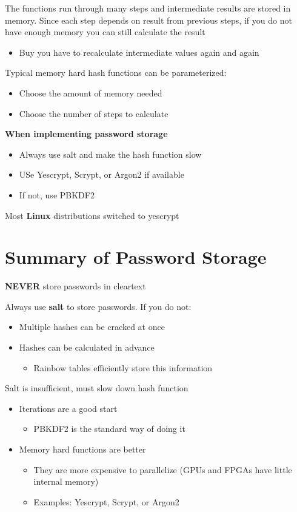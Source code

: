 \documentclass[11pt]{article}
\begin{document}
The functions run through many steps and intermediate results are stored in memory. Since each step depends on result from previous steps, if you do not have enough memory you can still calculate the result
\begin{itemize}
	\item Buy you have to recalculate intermediate values again and again
\end{itemize}

Typical memory hard hash functions can be parameterized:
\begin{itemize}
	\item Choose the amount of memory needed
	\item Choose the number of steps to calculate
\end{itemize}
\textbf{When implementing password storage}

\begin{itemize}
	\item Always use salt and make the hash function slow
	\item USe Yescrypt, Scrypt, or Argon2 if available
	\item If not, use PBKDF2
\end{itemize}

Most \textbf{Linux} distributions switched to yescrypt 

\section*{Summary of Password Storage}
\textbf{NEVER} store passwords in cleartext

Always use \textbf{salt} to store passwords. If you do not:
\begin{itemize}
	\item Multiple hashes can be cracked at once
	\item Hashes can be calculated in advance
		\begin{itemize}
			\item Rainbow tables efficiently store this information
		\end{itemize}
\end{itemize}

Salt is insufficient, must slow down hash function
\begin{itemize}
	\item Iterations are a good start
		\begin{itemize}
			\item PBKDF2 is the standard way of doing it
		\end{itemize}
	\item Memory hard functions are better
		\begin{itemize}
			\item They are more expensive to parallelize (GPUs and FPGAs have little internal memory)
			\item Examples: Yescrypt, Scrypt, or Argon2
		\end{itemize}
\end{itemize}
\end{document}
